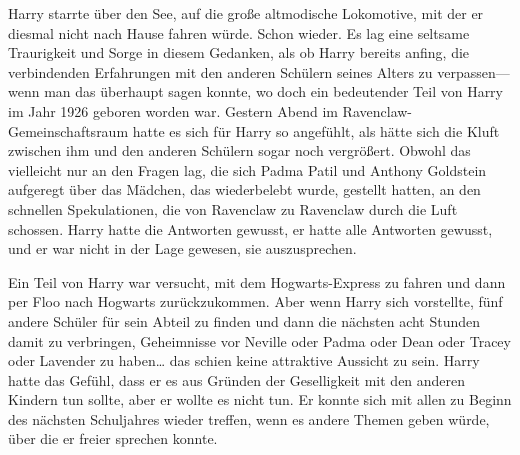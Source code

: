 Harry starrte über den See, auf die große altmodische Lokomotive, mit der er diesmal nicht nach Hause fahren würde. Schon wieder. Es lag eine seltsame Traurigkeit und Sorge in diesem Gedanken, als ob Harry bereits anfing, die verbindenden Erfahrungen mit den anderen Schülern seines Alters zu verpassen—wenn man das überhaupt sagen konnte, wo doch ein bedeutender Teil von Harry im Jahr 1926 geboren worden war. Gestern Abend im Ravenclaw-Gemeinschaftsraum hatte es sich für Harry so angefühlt, als hätte sich die Kluft zwischen ihm und den anderen Schülern sogar noch vergrößert. Obwohl das vielleicht nur an den Fragen lag, die sich Padma Patil und Anthony Goldstein aufgeregt über das Mädchen, das wiederbelebt wurde, gestellt hatten, an den schnellen Spekulationen, die von Ravenclaw zu Ravenclaw durch die Luft schossen. Harry hatte die Antworten gewusst, er hatte alle Antworten gewusst, und er war nicht in der Lage gewesen, sie auszusprechen.

Ein Teil von Harry war versucht, mit dem Hogwarts-Express zu fahren und dann per Floo nach Hogwarts zurückzukommen. Aber wenn Harry sich vorstellte, fünf andere Schüler für sein Abteil zu finden und dann die nächsten acht Stunden damit zu verbringen, Geheimnisse vor Neville oder Padma oder Dean oder Tracey oder Lavender zu haben… das schien keine attraktive Aussicht zu sein. Harry hatte das Gefühl, dass er es aus Gründen der Geselligkeit mit den anderen Kindern tun sollte, aber er wollte es nicht tun. Er konnte sich mit allen zu Beginn des nächsten Schuljahres wieder treffen, wenn es andere Themen geben würde, über die er freier sprechen konnte.

